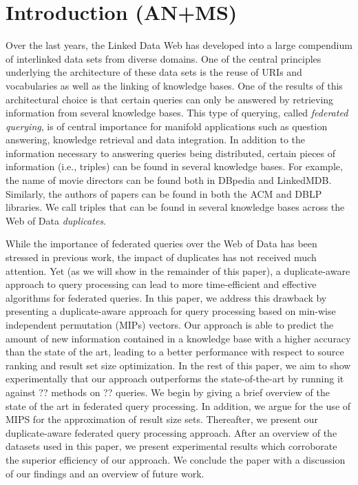 \documentclass{sig-alternate}  %
\begin{document}
\section{Introduction (AN+MS)}
Over the last years, the Linked Data Web has developed into a large compendium of interlinked data sets from diverse domains. 
One of the central principles underlying the architecture of these data sets is the reuse of URIs and vocabularies as well as the linking of knowledge bases\cite{key-20}.
One of the results of this architectural choice is that certain queries can only be answered by retrieving information from several knowledge bases.
This type of querying, called \emph{federated querying}, is of central importance for manifold applications such as question answering, knowledge retrieval and data integration.
In addition to the information necessary to answering queries being distributed, certain pieces of information (i.e., triples) can be found in several knowledge bases. 
For example, the name of movie directors can be found both in DBpedia and LinkedMDB.
Similarly, the authors of papers can be found in both the ACM and DBLP libraries.
We call triples that can be found in several knowledge bases across the Web of Data \emph{duplicates}.

While the importance of federated queries over the Web of Data has been stressed in previous work, the impact of duplicates has not received much attention.
Yet (as we will show in the remainder of this paper), a duplicate-aware approach to query processing can lead to more time-efficient and effective algorithms for federated queries.
In this paper, we address this drawback by presenting a duplicate-aware approach for query processing based on min-wise independent permutation (MIPs) vectors.
Our approach is able to predict the amount of new information contained in a knowledge base with a higher accuracy than the state of the art, leading to a better performance with respect to source ranking and result set size optimization. 
In the rest of this paper, we aim to show experimentally that our approach outperforms the state-of-the-art by running it against ?? methods on ?? queries. 
We begin by giving a brief overview of the state of the art in federated query processing.
In addition, we argue for the use of MIPS for the approximation of result size sets.
Thereafter, we present our duplicate-aware federated query processing approach.
After an overview of the datasets used in this paper, we present experimental results which corroborate the superior efficiency of our approach.
We conclude the paper with a discussion of our findings and an overview of future work.
\end{document}
